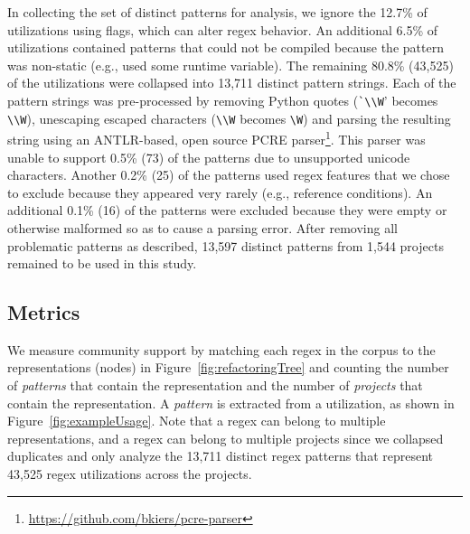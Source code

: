 In collecting the set of distinct patterns for analysis,  we ignore the 12.7\%  of utilizations using flags, which can alter regex behavior.  An additional 6.5\% of utilizations contained patterns that could not be compiled because the pattern was non-static (e.g., used some runtime variable).
The remaining 80.8\% (43,525) of the utilizations were collapsed into 13,711 distinct pattern strings.  Each of the pattern strings was pre-processed by removing Python quotes (\verb!`\\W!' becomes \verb!\\W!), unescaping escaped characters (\verb!\\W! becomes \verb!\W!) and parsing the resulting  string using an ANTLR-based, open source PCRE parser\footnote{\url{https://github.com/bkiers/pcre-parser}}.
This parser was unable to support 0.5\% (73) of the patterns due to unsupported unicode characters.  Another 0.2\% (25) of the patterns used regex features that we  chose to exclude because they appeared very rarely (e.g., reference conditions).  An additional 0.1\% (16) of the patterns were excluded because they were empty or otherwise malformed so as to cause a parsing error.  After removing all problematic patterns as described, 13,597 distinct patterns from 1,544 projects remained to be used in this study.



\subsection{Metrics}
\label{sec:communitymetric}
We measure community support by matching each regex in the corpus to the representations (nodes) in Figure~\ref{fig:refactoringTree} and counting the number of \emph{patterns} that contain the representation and the number of \emph{projects} that contain the representation.  
A \emph{pattern} is extracted from a utilization, as shown in Figure~\ref{fig:exampleUsage}. 
Note that a regex can belong to multiple representations, and a regex can belong to multiple projects since we collapsed duplicates and only analyze the 13,711 distinct regex patterns that represent 43,525 regex utilizations across the projects. 
%
%



